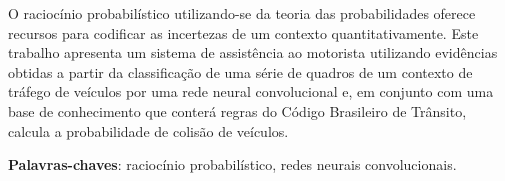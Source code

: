 \documentclass[
	12pt,				%
    oneside,			%
	a4paper,			%
	english,			%
	french,				%
	spanish,			%
	brazil,				%
	]{abntex2}
\begin{document}
\frenchspacing 


\imprimircapa

\imprimirfolhaderosto*






\begin{resumo} %
O raciocínio probabilístico utilizando-se da teoria das probabilidades oferece recursos para codificar as incertezas de um contexto quantitativamente. Este trabalho apresenta um sistema de assistência ao motorista utilizando evidências obtidas a partir da classificação de uma série de quadros de um contexto de tráfego de veículos por uma rede neural convolucional e, em conjunto com uma base de conhecimento que conterá regras do Código Brasileiro de Trânsito, calcula a probabilidade de colisão de veículos.


 \vspace{\onelineskip}
    
 \noindent
 \textbf{Palavras-chaves}: raciocínio probabilístico, redes neurais convolucionais.
\end{resumo} %

\end{document}
